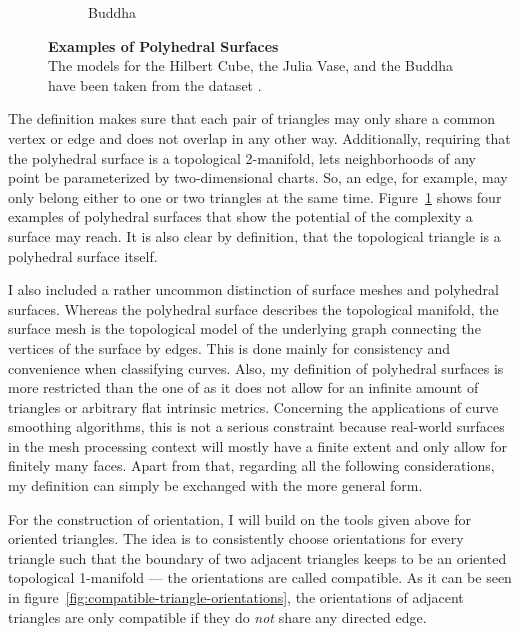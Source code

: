 \documentclass{stdlocal}
\begin{document}
\begin{figure}[t]
\begin{subfigure}[b]{0.23\linewidth}
      \caption{Buddha}
    \end{subfigure}
    \caption[Examples of Polyhedral Surfaces]{%
      \textbf{Examples of Polyhedral Surfaces}\\
      The models for the Hilbert Cube, the Julia Vase, and the Buddha have been taken from the  dataset \autocite{thingi10k}.
    }
    \label{fig:polyhedral-surface-examples}
  \end{figure}

  \noindent
  The definition makes sure that each pair of triangles may only share a common vertex or edge and does not overlap in any other way.
  Additionally, requiring that the polyhedral surface is a topological 2-manifold, lets neighborhoods of any point be parameterized by two-dimensional charts.
  So, an edge, for example, may only belong either to one or two triangles at the same time.
  Figure~\ref{fig:polyhedral-surface-examples} shows four examples of polyhedral surfaces that show the potential of the complexity a surface may reach.
  It is also clear by definition, that the topological triangle is a polyhedral surface itself.

  I also included a rather uncommon distinction of surface meshes and polyhedral surfaces.
  Whereas the polyhedral surface describes the topological manifold, the surface mesh is the topological model of the underlying graph connecting the vertices of the surface by edges.
  This is done mainly for consistency and convenience when classifying curves.
  Also, my definition of polyhedral surfaces is more restricted than the one of \textcite{polthier2006} as it does not allow for an infinite amount of triangles or arbitrary flat intrinsic metrics.
  Concerning the applications of curve smoothing algorithms, this is not a serious constraint because real-world surfaces in the mesh processing context will mostly have a finite extent and only allow for finitely many faces.
  Apart from that, regarding all the following considerations, my definition can simply be exchanged with the more general form.

  For the construction of orientation, I will build on the tools given above for oriented triangles.
  The idea is to consistently choose orientations for every triangle such that the boundary of two adjacent triangles keeps to be an oriented topological 1-manifold --- the orientations are called compatible.
  As it can be seen in figure~\ref{fig:compatible-triangle-orientations}, the orientations of adjacent triangles are only compatible if they do \textit{not} share any directed edge.
\end{document}
